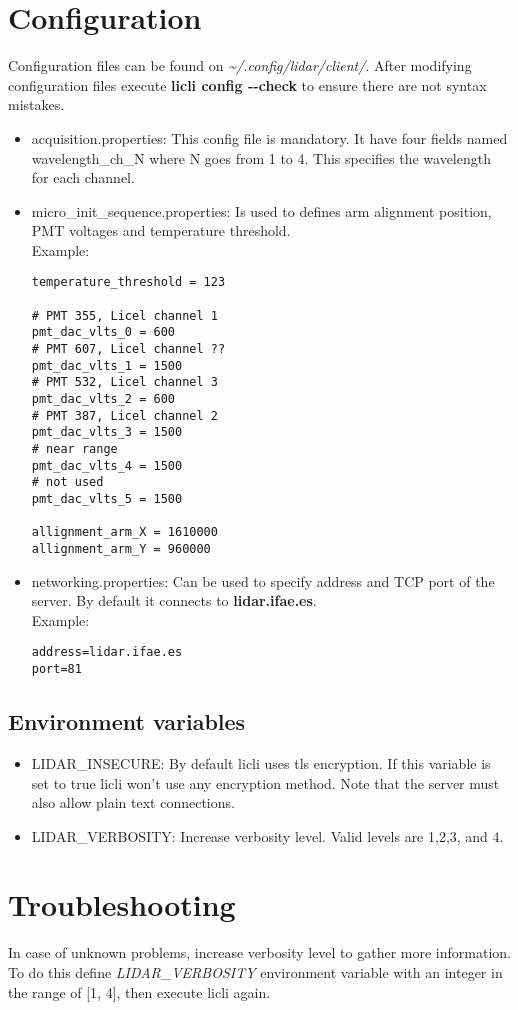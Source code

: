\documentclass[letterpaper, 10 pt]{article}
\begin{document}
\section{Configuration} \label{cfg}
Configuration files can be found on \textit{\~{}/.config/lidar/client/}. After modifying configuration files execute \textbf{licli config -{}-check} to ensure there are not syntax mistakes.
\begin{itemize}
	\item acquisition.properties: This config file is mandatory. It have four fields named wavelength\_ch\_N where N goes from 1 to 4. This specifies the wavelength for each channel. 
	\item micro\_init\_sequence.properties: Is used to defines arm alignment position, PMT voltages and temperature threshold.	\\
	
	Example: 
	\begin{verbatim}
temperature_threshold = 123

# PMT 355, Licel channel 1
pmt_dac_vlts_0 = 600
# PMT 607, Licel channel ??
pmt_dac_vlts_1 = 1500
# PMT 532, Licel channel 3
pmt_dac_vlts_2 = 600
# PMT 387, Licel channel 2
pmt_dac_vlts_3 = 1500
# near range
pmt_dac_vlts_4 = 1500
# not used
pmt_dac_vlts_5 = 1500

allignment_arm_X = 1610000
allignment_arm_Y = 960000
	\end{verbatim}
	\item networking.properties: Can be used to specify address and TCP port of the server. By default it connects to \textbf{lidar.ifae.es}. \\
		Example: 
	\begin{verbatim}
address=lidar.ifae.es
port=81
	\end{verbatim}
\end{itemize} 
\subsection{Environment variables}
\begin{itemize}
	\item LIDAR\_INSECURE: By default licli uses tls encryption. If this variable is set to true licli won't use any encryption method. Note that the server must also allow plain text connections.
	\item LIDAR\_VERBOSITY: Increase verbosity level. Valid levels are 1,2,3, and 4.
\end{itemize}

\section{Troubleshooting}
In case of unknown problems, increase verbosity level to gather more information. To do this define \emph{LIDAR\_VERBOSITY} environment variable with an integer in the range of [1, 4], then execute licli again.
\end{document}

